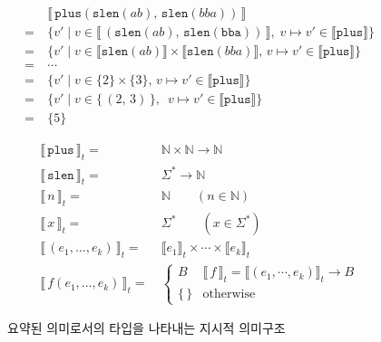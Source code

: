 {\addtolength{\jot}{-.5ex}
\begin{align*}
  & \llbracket\,\texttt{plus}(\texttt{slen}(ab),\,\texttt{slen}(bba))\,\rrbracket \\
=~& \{ v' \mid
       v \in \llbracket\,(\texttt{slen}(ab),\,\texttt{slen}(\texttt{bba}))\,\rrbracket,\;
       v\mapsto v' \in \llbracket\texttt{plus}\rrbracket \} \\
=~& \{ v' \mid
       v \in \llbracket\texttt{slen}(ab)\rrbracket\times
             \llbracket\texttt{slen}(bba)\rrbracket,\,
       v\mapsto v' \in \llbracket\texttt{plus}\rrbracket \} \\
=~& \cdots \\
=~& \{ v' \mid
       v \in \{2\}\times\{3\},\,
       v\mapsto v' \in \llbracket\texttt{plus}\rrbracket \} \\
=~& \{ v' \mid v\in \{\,(2,\,3)\,\},~\;
       v\mapsto v' \in \llbracket\texttt{plus}\rrbracket \} \\
=~& \{5\}
\end{align*}
}

\begin{figure}
\begin{align*}
\llbracket\,\texttt{plus}\,\rrbracket_t =~& \mathbb{N}\times\mathbb{N} \to \mathbb{N} \\
\llbracket\,\texttt{slen}\,\rrbracket_t =~& \Sigma^{*} \to \mathbb{N} \\
\llbracket\,n\,\rrbracket_t =~& \mathbb{N} \qquad (n\in\mathbb{N}) \\
\llbracket\,x\,\rrbracket_t =~& \Sigma^{*} \qquad (x\in\Sigma^{*}) \\
\llbracket\,(e_1,\ldots,e_k)\,\rrbracket_t =~& 
    \llbracket e_1\rrbracket_t\times\cdots\times\llbracket e_k\rrbracket_t \\
\llbracket\,f(e_1,\ldots,e_k)\,\rrbracket_t =~& \!\!\!\!
    \begin{cases}
     B & \llbracket\,f\,\rrbracket_t = \llbracket(e_1,\cdots,e_k)\rrbracket_t \to B\\
     \{\,\} & \text{otherwise}
    \end{cases}
\end{align*}
\caption{요약된 의미로서의 타입을 나타내는 지시적 의미구조\label{fig:AbsSemType}}
\end{figure}

